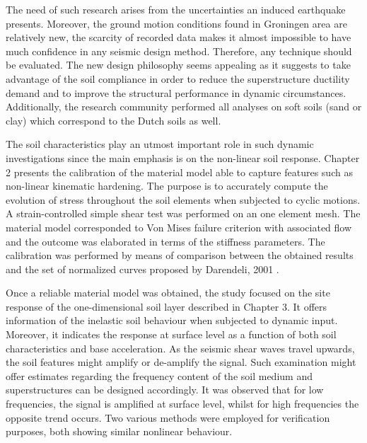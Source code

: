 The need of such research arises from the uncertainties an induced earthquake presents. Moreover, the ground motion conditions found in Groningen area are relatively new, the scarcity of recorded data makes it almost impossible to have much confidence in any seismic design method. Therefore, any technique should be evaluated. The new design philosophy seems appealing as it suggests to take advantage of the soil compliance in order to reduce the superstructure ductility demand and to improve the structural performance in dynamic circumstances. Additionally, the research community performed all analyses on soft soils (sand or clay) which correspond to the Dutch soils as well.

The soil characteristics play an utmost important role in such dynamic investigations since the main emphasis is on the non-linear soil response. Chapter 2 presents the calibration of the material model able to capture features such as non-linear kinematic hardening. The purpose is to accurately compute the evolution of stress throughout the soil elements when subjected to cyclic motions. A strain-controlled simple shear test was performed on an one element mesh. The material model corresponded to Von Mises failure criterion with associated flow and the outcome was elaborated in terms of the stiffness parameters. The calibration was performed by means of comparison between the obtained results and the set of normalized curves proposed by Darendeli, 2001 \cite{darendeli2001development}.

Once a reliable material model was obtained, the study focused on the site response of the one-dimensional soil layer described in Chapter 3. It offers information of the inelastic soil behaviour when subjected to dynamic input. Moreover, it indicates the response at surface level as a function of both soil characteristics and base acceleration. As the seismic shear waves travel upwards, the soil features might amplify or de-amplify the signal. Such examination might offer estimates regarding the frequency content of the soil medium and superstructures can be designed accordingly. It was observed that for low frequencies, the signal is amplified at surface level, whilst for high frequencies the opposite trend occurs. Two various methods were employed for verification purposes, both showing similar nonlinear behaviour.

